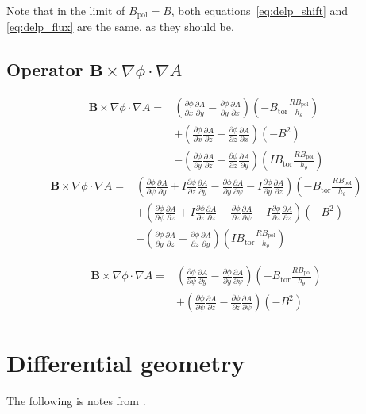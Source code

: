 \documentclass[12pt]{article}
\newcommand{\deriv}[2]{\ensuremath{\frac{\partial #1}{\partial #2}}}
\newcommand{\hthe}{\ensuremath{h_\theta}}
\newcommand{\Bp}{\ensuremath{B_{\text{pol}}}}
\newcommand{\Bt}{\ensuremath{B_{\text{tor}}}}
\newcommand{\ve}[1]{\ensuremath{\boldsymbol{#1}}}
\newcommand{\Bvec}{\ve{B}}
\newcommand{\rbp}{\ensuremath{R\Bp}}
\begin{document}
Note that in the limit of $\Bp = B$, both equations~\ref{eq:delp_shift} 
and \ref{eq:delp_flux} are the same, as they should be.



\subsection{Operator $\Bvec\times\nabla\phi\cdot\nabla A$}
%
\begin{align*}
\Bvec\times\nabla\phi\cdot\nabla A =& \left(\deriv{\phi}{x}\deriv{A}{y} - 
\deriv{\phi}{y}\deriv{A}{x}\right)\left(-\Bt\frac{\rbp}{\hthe}\right) \\
&+ \left(\deriv{\phi}{x}\deriv{A}{z} - 
\deriv{\phi}{z}\deriv{A}{x}\right)\left(-B^2\right) \\
&- \left(\deriv{\phi}{y}\deriv{A}{z} - 
\deriv{\phi}{z}\deriv{A}{y}\right)\left(I\Bt\frac{\rbp}{\hthe}\right)
\end{align*}
%
%
\begin{align*}
\Bvec\times\nabla\phi\cdot\nabla A =& \left(\deriv{\phi}{\psi}\deriv{A}{y} + I 
\deriv{\phi}{z}\deriv{A}{y} - \deriv{\phi}{y}\deriv{A}{\psi} - 
I\deriv{\phi}{y}\deriv{A}{z}\right)\left(-\Bt\frac{\rbp}{\hthe}\right) \\
&+ \left(\deriv{\phi}{\psi}\deriv{A}{z} + I\deriv{\phi}{z}\deriv{A}{z} - 
\deriv{\phi}{z}\deriv{A}{\psi} - 
I\deriv{\phi}{z}\deriv{A}{z}\right)\left(-B^2\right) \\
&- \left(\deriv{\phi}{y}\deriv{A}{z} - 
\deriv{\phi}{z}\deriv{A}{y}\right)\left(I\Bt\frac{\rbp}{\hthe}\right)
\end{align*}
%

%
\begin{align*}
\Bvec\times\nabla\phi\cdot\nabla A =& \left(\deriv{\phi}{\psi}\deriv{A}{y} - 
\deriv{\phi}{y}\deriv{A}{\psi}\right)\left(-\Bt\frac{\rbp}{\hthe}\right) 
\nonumber \\
&+ \left(\deriv{\phi}{\psi}\deriv{A}{z} - \deriv{\phi}{z}\deriv{A}{\psi} 
\right)\left(-B^2\right)
\end{align*}
%






\appendix



\section{Differential geometry}
The following is notes from \cite{hazeltine-2003}.
\end{document}
